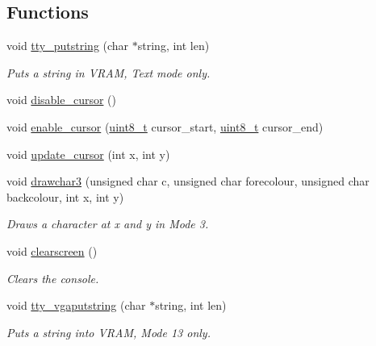 \subsection*{Functions}
\begin{DoxyCompactItemize}
\item 
void \hyperlink{a00149_a5b5bf610a57f3c59b2851fa2652081ec_a5b5bf610a57f3c59b2851fa2652081ec}{tty\+\_\+putstring} (char $\ast$string, int len)
\begin{DoxyCompactList}\small\item\em Puts a string in V\+R\+AM, Text mode only. \end{DoxyCompactList}\item 
void \hyperlink{a00149_a3d09038c7b6436e60b228f2f3f451f6a_a3d09038c7b6436e60b228f2f3f451f6a}{disable\+\_\+cursor} ()
\item 
void \hyperlink{a00149_afe197dc4dbfa6036ef04abd2aeeeca2d_afe197dc4dbfa6036ef04abd2aeeeca2d}{enable\+\_\+cursor} (\hyperlink{a00125_aba7bc1797add20fe3efdf37ced1182c5_aba7bc1797add20fe3efdf37ced1182c5}{uint8\+\_\+t} cursor\+\_\+start, \hyperlink{a00125_aba7bc1797add20fe3efdf37ced1182c5_aba7bc1797add20fe3efdf37ced1182c5}{uint8\+\_\+t} cursor\+\_\+end)
\item 
void \hyperlink{a00149_a492f5021d7340613e732ef37bbaa04e4_a492f5021d7340613e732ef37bbaa04e4}{update\+\_\+cursor} (int x, int y)
\item 
void \hyperlink{a00149_acb9a978008cfa67b0038e85eb56d2d41_acb9a978008cfa67b0038e85eb56d2d41}{drawchar3} (unsigned char c, unsigned char forecolour, unsigned char backcolour, int x, int y)
\begin{DoxyCompactList}\small\item\em Draws a character at x and y in Mode 3. \end{DoxyCompactList}\item 
void \hyperlink{a00149_aff4bc17c602603d120756f52e18ebb96_aff4bc17c602603d120756f52e18ebb96}{clearscreen} ()
\begin{DoxyCompactList}\small\item\em Clears the console. \end{DoxyCompactList}\item 
void \hyperlink{a00149_a05ca3f5e64f38fec173b635ca8465415_a05ca3f5e64f38fec173b635ca8465415}{tty\+\_\+vgaputstring} (char $\ast$string, int len)
\begin{DoxyCompactList}\small\item\em Puts a string into V\+R\+AM, Mode 13 only. \end{DoxyCompactList}\item 

\end{DoxyCompactItemize}

